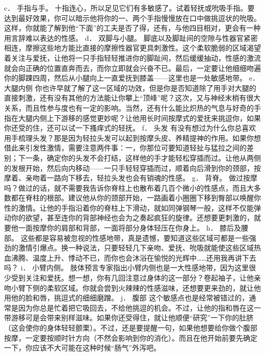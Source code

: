 \documentclass[12pt,UTF8,openany]{ctexbook}
\begin{document}
c． 手指与手。
十指连心，所以足见它们有多敏感了。试着轻抚或吮吸手指。要达到最好效果，你可以暗示他将你的一、两个手指慢慢放在口中做挑逗状的吮吸。这样，你就能了解到他“下面”的工夫是否了得，还有，与他四目相对，更会有一种用言辞难以表达的性感。
d． 双脚与小腿。
脚底以及脚趾间的空隙与性器官紧密相连，摩擦这些地方能比直接的摩擦性器官更具刺激性。这个柔软脆弱的区域渴望着关注与爱抚，让他将一只手指轻轻推进你的脚趾间，然后缓缓抽动，性感的激流就会向正确的位置直奔而去，而你立即就会兴奋不已。最后，一定要让他细细吻遍你的脚踝四周，然后从小腿向上一直爱抚到膝盖——这里也是一处敏感地带。
e． 大腿内侧
你也许早就了解了这一区域的功效，但是你是否知道除了用手对大腿的直接刺激，还有没有其他的方法能让你攀上“顶峰”呢？这次，又与神经末梢有很大关系，而且性参与度也有一定的影响。当然，还有什么能比炽热的气息与好奇的手指在大腿内侧上下游移的感觉更妙呢？让他用长时间按摩式的爱抚来挑逗你，如果你还受的住，还可以试一下搔痒式的轻抚。
f． 头发
有没有想过为什么你总喜欢用手梳理头发？那是因为轻拉头发可以起到按摩头皮、养精提神的作用。如果你想借此来引发性激情，需要注意两件事：一，你那位可要知道轻扯与猛拉之间的差别；下一条，确定你的头发不会打结，这样他的手才能轻松穿插而过。让他从两侧的发根开始，然后向内移动——一只手轻轻穿插而过，顺着向后滑到你的颈部，按摩着、亲吻着一路向下移去，轻拉头发也会有销魂的性感。
g． 背脊。
做过按摩吗？做过的话，就不需要我告诉你脊柱上也散布着几百个微小的性感点，而且大多数都在脊柱的根部。建议他从你的颈部开始，一路画着小圈圈下移到臀部以唤醒你性的激情。让他的手指沿着你的脊柱上下滑动，就如同弹钢琴一般，这样不仅能弹动你的欲望，甚至连你的背部神经也会为之奏起疯狂的旋律。还想要更刺激的，就要他一面按摩你的肩部和背部，一面将部分身体轻压在你身上。
h． 膝后及腰部。
这些都是容易被忽视的性感地带，真是遗憾，要知道这些区域可都是一些强劲的激情引爆点。换一种说法，只要轻轻几下亲吻、爱抚、吮吸就能使这些区域热血沸腾、温度上升、悸动不已，而你也会沐浴在愉悦的光辉中……还用我再讲下去吗？
i． 小臂内侧。
肢体预言专家指出小臂内侧也是一大性感地带，因为这里很少受到关注和爱抚。想一想，你有几回注意过身体的这一部分？卷起袖子，让他亲吻小臂下侧的柔软区域。你就会尝到火辣辣的性感滋味，还想要更来劲的，就让他用他的脸和唇，挑逗式的细细磨蹭。
j． 腹部
这个敏感点也是经常被错过的，通常是因为你总是忙着把它吸回去，不给他挑逗的机会。不过，让他的指和唇在这一带游移可是会带来别样滋味。如果你还受得住，就让他顺便“研究”一下你的肚脐（这会使你的身体轻轻颤栗）。不过，还是要提醒一句，如果他想要给你做个腹部按摩，一定要按顺时针方向（不然会影响到你的消化）。而且在他开始前要先确定一下，你应该不大可能在这种时候“肠气”外泻吧。
\end{document}
